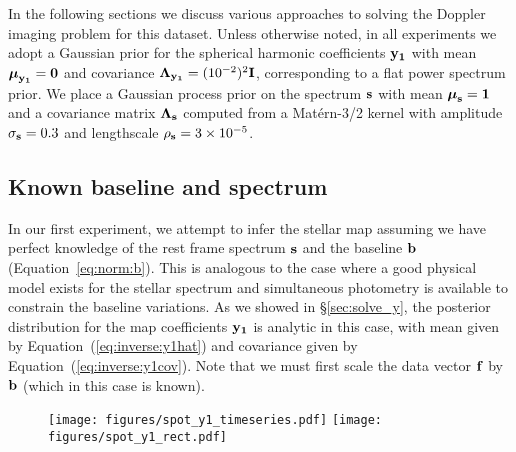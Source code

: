 \documentclass[modern]{aastex62}
\begin{document}

In the following sections we discuss various approaches to 
solving the Doppler imaging problem for this dataset.
Unless otherwise noted, in all experiments we adopt a Gaussian prior
for the spherical harmonic coefficients ${\mathbf{y_1}}$ with mean
$\boldsymbol{\mu}_{\mathbf{y_1}} = {\mathbf{0}}$ and covariance
$\boldsymbol{\Lambda}_{\mathbf{y_1}} = (10^{-2})^2{\mathbf{I}}$,
corresponding to a flat power spectrum prior.
We place a Gaussian process prior on the spectrum ${\mathbf{s}}$ with mean
$\boldsymbol{\mu}_{\mathbf{s}} = {\mathbf{1}}$ and a covariance matrix
$\boldsymbol{\Lambda}_{\mathbf{s}}$ computed from
 a Mat\'ern-3/2 kernel with amplitude $\sigma_{\mathbf{s}} = 0.3$
and lengthscale $\rho_{\mathbf{s}} = 3\times 10^{-5}$.

\subsection{Known baseline and spectrum}
\label{sec:spot_y1}
%
In our first experiment, we attempt to infer the stellar map assuming
we have perfect knowledge of the rest frame spectrum ${\mathbf{s}}$ and
the baseline ${\mathbf{b}}$ (Equation~\ref{eq:norm:b}). 
This is analogous to the case where a good physical model exists for
the stellar spectrum and simultaneous photometry is available to
constrain the baseline variations.
As we showed in
\S\ref{sec:solve_y}, the posterior distribution for the map coefficients 
${\mathbf{y_1}}$ is analytic in this case, with mean given by Equation~(\ref{eq:inverse:y1hat})
and covariance given by Equation~(\ref{eq:inverse:y1cov}). Note that
we must first scale the data vector ${\mathbf{f}}$ by ${\mathbf{b}}$ (which in this
case is known).

\begin{figure}[p!]
    \begin{centering}
    \texttt{[image: figures/spot\_y1\_timeseries.pdf]}
    \texttt{[image: figures/spot\_y1\_rect.pdf]}
    \end{centering}
\end{figure}
\end{document}
